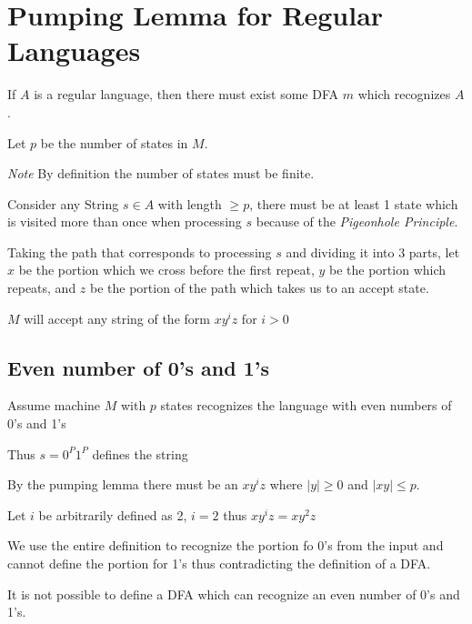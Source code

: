 \documentclass[12pt,letterpaper, twocolumn]{article}
\begin{document}
\section{Pumping Lemma for Regular Languages}

If $A$ is a regular language, then there must exist some DFA $m$ which recognizes $A$. 

Let $p$ be the number of states in $M$. 

\textit{Note} By definition the number of states must be finite. 

Consider any String $s \in A$ with length $\ge p$, there must be at least 1 state which is visited more than once when processing $s$ because of the \textit{Pigeonhole Principle}. 

Taking the path that corresponds to processing $s$ and dividing it into 3 parts, let $x$ be the portion which we cross before the first repeat, $y$ be the portion which repeats, and $z$ be the portion of the path which takes us to an accept state. 

$M$ will accept any string of the form $x{y^i}z$ for $i>0$

\subsection{Even number of 0's and 1's}
Assume machine $M$ with $p$ states recognizes the language with even numbers of 0's and 1's

Thus $s=0^P1^P$ defines the string

By the pumping lemma there must be an $x{y^i}z$ where $|y|\ge0$ and $|xy|\le p$. 

Let $i$ be arbitrarily defined as 2, $i=2$ thus $x{y^i}z=xy^2z$

We use the entire definition to recognize the portion fo 0's from the input and cannot define the portion for 1's thus contradicting the definition of a DFA. 

It is not possible to define a DFA which can recognize an even number of 0's and 1's. 
\end{document}
